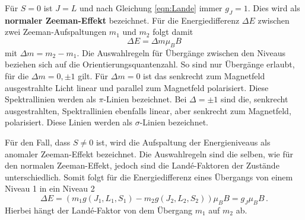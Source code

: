 Für $S=0$ ist $J=L$ und nach Gleichung \ref{eqn:Lande} immer $g_J = 1$.
Dies wird als \textbf{normaler Zeeman-Effekt} bezeichnet.
Für die Energiedifferenz $\Delta E$ zwischen zwei Zeeman-Aufspaltungen $m_1$ und $m_2$ folgt damit
\begin{equation*}
  \Delta E = \Delta m \mu_B B
\end{equation*}
mit $\Delta m  = m_2 - m_1$.
Die Auswahlregeln für Übergänge zwischen den Niveaus beziehen sich auf die Orientierungsquantenzahl.
So sind nur Übergänge erlaubt, für die $\Delta m = 0, \pm 1$ gilt.
Für $\Delta m = 0$ ist das senkrecht zum Magnetfeld ausgestrahlte Licht linear und parallel zum Magnetfeld polarisiert.
Diese Spektrallinien werden als $\pi$-Linien bezeichnet.
Bei $\Delta = \pm1$ sind die, senkrecht ausgestrahlten, Spektrallinien ebenfalls linear, aber senkrecht zum Magnetfeld, polarisiert.
Diese Linien werden als $\sigma$-Linien bezeichnet.

\par\bigskip

Für den Fall, dass $S \neq 0$ ist, wird die Aufspaltung der Energieniveaus als anomaler Zeeman-Effekt bezeichnet.
Die Auswahlregeln sind die selben, wie für den normalen Zeeman-Effekt, jedoch sind die Landé-Faktoren der Zustände unterschiedlich.
Somit folgt für die Energiedifferenz eines Übergangs von einem Niveau 1 in ein Niveau 2
\begin{equation} \label{eqn:an_zeeman}
  \Delta E = \left( m_1 g(J_1,L_1,S_1) - m_2 g(J_2,L_2,S_2) \right) \mu_B B = g_J \mu_B B \, .
\end{equation}
Hierbei hängt der Landé-Faktor von dem Übergang $m_1$ auf $m_2$ ab.
